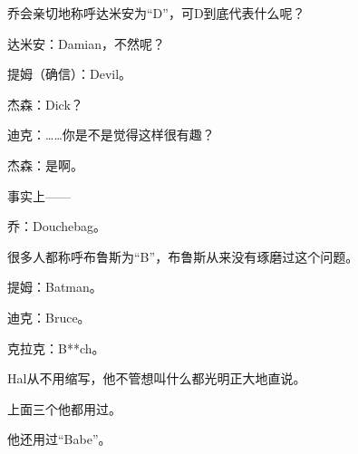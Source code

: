 乔会亲切地称呼达米安为“D”，可D到底代表什么呢？

达米安：Damian，不然呢？

提姆（确信）：Devil。

杰森：Dick？

迪克：……你是不是觉得这样很有趣？

杰森：是啊。

事实上——

乔：Douchebag。



很多人都称呼布鲁斯为“B”，布鲁斯从来没有琢磨过这个问题。

提姆：Batman。

迪克：Bruce。

克拉克：B**ch。

Hal从不用缩写，他不管想叫什么都光明正大地直说。

上面三个他都用过。

他还用过“Babe”。